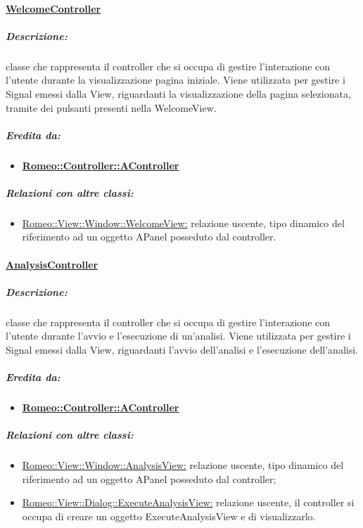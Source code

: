 		\paragraph{\underline{WelcomeController}}
		\label{controller_wp}
			\subparagraph{Descrizione:} classe che rappresenta il controller che si occupa di gestire l'interazione con l'utente durante la visualizzazione pagina iniziale. Viene utilizzata per gestire i Signal\g{} emessi dalla View, riguardanti la visualizzazione della pagina selezionata, tramite dei pulsanti presenti nella WelcomeView.
			\subparagraph{Eredita da:}
			\begin{itemize}
				\item \textbf{\hyperref[controller_a]{Romeo::Controller::AController}}
			\end{itemize}
			\subparagraph{Relazioni con altre classi:}
				\begin{itemize}
					\item \hyperref[wv]{Romeo::View::Window::WelcomeView:} relazione uscente, tipo dinamico del riferimento ad un oggetto APanel posseduto dal controller.
				\end{itemize}
		
		\paragraph{\underline{AnalysisController}}
		\label{controller_sa}
			\subparagraph{Descrizione:} classe che rappresenta il controller che si occupa di gestire l'interazione con l'utente durante l'avvio e l'esecuzione di un'analisi. Viene utilizzata per gestire i Signal\g{} emessi dalla View, riguardanti l'avvio dell'analisi e l'esecuzione dell'analisi.
			\subparagraph{Eredita da:}
			\begin{itemize}
				\item \textbf{\hyperref[controller_a]{Romeo::Controller::AController}}
			\end{itemize}
			\subparagraph{Relazioni con altre classi:}
				\begin{itemize}
					\item \hyperref[sav]{Romeo::View::Window::AnalysisView:} relazione uscente, tipo dinamico del riferimento ad un oggetto APanel posseduto dal controller;
					\item \hyperref[eav]{Romeo::View::Dialog::ExecuteAnalysisView:} relazione uscente, il controller si occupa di creare un oggetto ExecuteAnalysisView e di visualizzarlo.
				\end{itemize}
		
